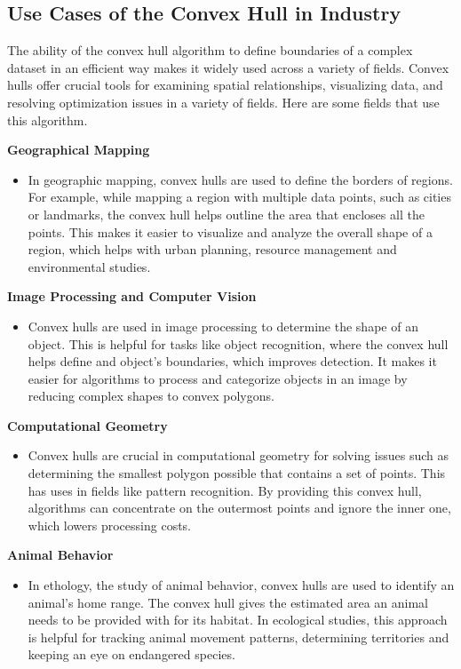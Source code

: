     \pagebreak

    \subsection{Use Cases of the Convex Hull in Industry}
    The ability of the convex hull algorithm to define boundaries of a complex dataset in an efficient way makes it widely used across a variety of fields. Convex hulls offer crucial tools for examining spatial relationships, visualizing data, and resolving optimization issues in a variety of fields. Here are some fields that use this algorithm.

    \textbf{Geographical Mapping}
    \begin{itemize}
        \item In geographic mapping, convex hulls are used to define the borders of regions. For example, while mapping a region with multiple data points, such as cities or landmarks, the convex hull helps outline the area that encloses all the points. This makes it easier to visualize and analyze the overall shape of a region, which helps with urban planning, resource management and environmental studies.
    \end{itemize}
    \textbf{Image Processing and Computer Vision}
    \begin{itemize}
        \item Convex hulls are used in image processing to determine the shape of an object. This is helpful for tasks like object recognition, where the convex hull helps define and object's boundaries, which improves detection. It makes it easier for algorithms to process and categorize objects in an image by reducing complex shapes to convex polygons.
    \end{itemize}
    \textbf{Computational Geometry}
    \begin{itemize}
        \item Convex hulls are crucial in computational geometry for solving issues such as determining the smallest polygon possible that contains a set of points. This has uses in fields like pattern recognition. By providing this convex hull, algorithms can concentrate on the outermost points and ignore the inner one,  which lowers processing costs.
    \end{itemize}
    \textbf{Animal Behavior}
    \begin{itemize}
        \item In ethology, the study of animal behavior, convex hulls are used to identify an animal's home range. The convex hull gives the estimated area an animal needs to be provided with for its habitat. In ecological studies, this approach is helpful for tracking animal movement patterns, determining territories and keeping an eye on endangered species.
    \end{itemize}

